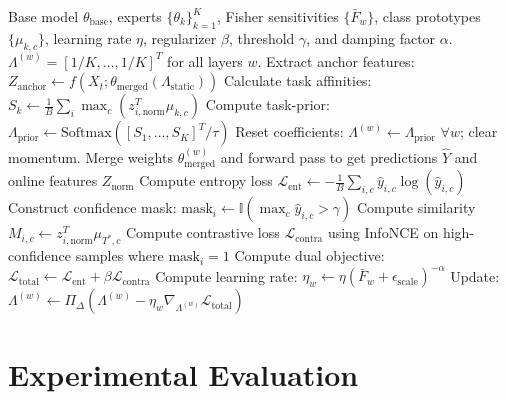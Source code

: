 \documentclass{article}
\theoremstyle{plain}
\theoremstyle{definition}
\theoremstyle{remark}
\begin{document}
\begin{algorithm}[tb]
\caption{Fisher-Preconditioned Contrastive Alignment (FP-CA)}
\label{algo:fp_ca}
\begin{small}
\begin{algorithmic}[1]
 Base model $\theta_{\text{base}}$, experts $\{\theta_k\}_{k=1}^K$, Fisher sensitivities $\{\bar{F}_w\}$, class prototypes $\{\mu_{k,c}\}$, learning rate $\eta$, regularizer $\beta$, threshold $\gamma$, and damping factor $\alpha$.
 $\Lambda^{(w)} = [1/K, \ldots, 1/K]^T$ for all layers $w$.
  \STATE Extract anchor features: $Z_{\text{anchor}} \leftarrow f(X_t; \theta_{\text{merged}}(\Lambda_{\text{static}}))$
  \STATE Calculate task affinities: $S_k \leftarrow \frac{1}{B}\sum_i \max_c (z_{i,\text{norm}}^T \mu_{k,c})$
  \STATE Compute task-prior: $\Lambda_{\text{prior}} \leftarrow \text{Softmax}([S_1, \ldots, S_K]^T / \tau)$
    \STATE Reset coefficients: $\Lambda^{(w)} \leftarrow \Lambda_{\text{prior}}$ $\forall w$; clear momentum.
  \ENDIF
  \STATE Merge weights $\theta_{\text{merged}}^{(w)}$ and forward pass to get predictions $\hat{Y}$ and online features $Z_{\text{norm}}$
  \STATE Compute entropy loss $\mathcal{L}_{\text{ent}} \leftarrow -\frac{1}{B}\sum_{i,c} \hat{y}_{i,c}\log(\hat{y}_{i,c})$
  \STATE Construct confidence mask: $\text{mask}_i \leftarrow \mathbb{I}(\max_c \hat{y}_{i,c} > \gamma)$
  \STATE Compute similarity $M_{i,c} \leftarrow z_{i,\text{norm}}^T \mu_{T^*,c}$
  \STATE Compute contrastive loss $\mathcal{L}_{\text{contra}}$ using InfoNCE on high-confidence samples where $\text{mask}_i = 1$
  \STATE Compute dual objective: $\mathcal{L}_{\text{total}} \leftarrow \mathcal{L}_{\text{ent}} + \beta \mathcal{L}_{\text{contra}}$
    \STATE Compute learning rate: $\eta_w \leftarrow \eta (\bar{F}_w + \epsilon_{\text{scale}})^{-\alpha}$
    \STATE Update: $\Lambda^{(w)} \leftarrow \Pi_{\Delta} \left( \Lambda^{(w)} - \eta_w \nabla_{\Lambda^{(w)}}\mathcal{L}_{\text{total}} \right)$
  \ENDFOR
\ENDFOR
\end{algorithmic}
\end{small}
\end{algorithm}

\section{Experimental Evaluation}
\label{experiments}
\end{document}
